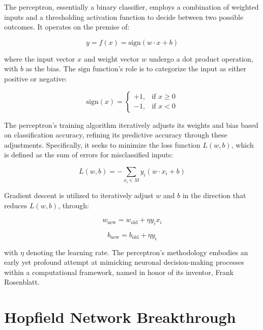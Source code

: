 \documentclass[12pt,a4paper]{report}
\begin{document}
The perceptron, essentially a binary classifier, employs a combination of weighted inputs and a thresholding activation function to decide between two possible outcomes. It operates on the premise of:

\begin{equation}
    y = f(x) = \text{sign}(w \cdot x + b)
\end{equation}

where the input vector \( x \) and weight vector \( w \) undergo a dot product operation, with \( b \) as the bias. The \( \text{sign} \) function's role is to categorize the input as either positive or negative:

\begin{equation}
    \text{sign}(x) = 
\begin{cases}
+1, & \text{if } x \geq 0 \\
-1, & \text{if } x < 0
\end{cases}
\end{equation}

The perceptron's training algorithm iteratively adjusts its weights and bias based on classification accuracy, refining its predictive accuracy through these adjustments. Specifically, it seeks to minimize the loss function \( L(w,b) \), which is defined as the sum of errors for misclassified inputs:

\begin{equation}
L(w,b) = - \sum_{x_i \in M} y_i (w \cdot x_i + b)
\end{equation}

Gradient descent is utilized to iteratively adjust \( w \) and \( b \) in the direction that reduces \( L(w,b) \), through:

\begin{equation}
w_{\text{new}} = w_{\text{old}} + \eta y_i x_i
\end{equation}

\begin{equation}
b_{\text{new}} = b_{\text{old}} + \eta y_i
\end{equation}

with \( \eta \) denoting the learning rate. The perceptron's methodology embodies an early yet profound attempt at mimicking neuronal decision-making processes within a computational framework, named in honor of its inventor, Frank Rosenblatt.

\section{Hopfield Network Breakthrough}
\end{document}
